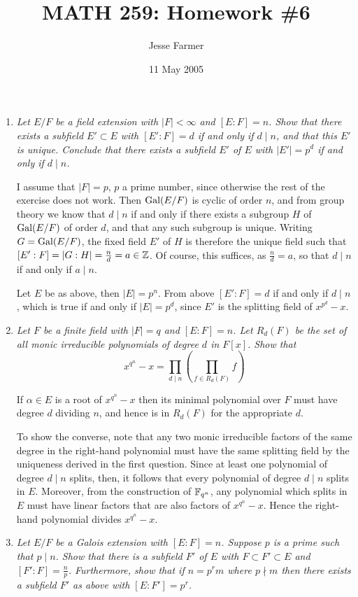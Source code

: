 \documentclass[10pt]{article}
\title{MATH 259: Homework \#6}
\author{Jesse Farmer}
\date{11 May 2005}
\begin{document}
\maketitle
\begin{enumerate}

\item \emph{Let $E/F$ be a field extension with $|F| < \infty$ and $[E:F] = n$.  Show that there exists a subfield $E' \subset E$ with $[E':F] = d$ if and only if $d \mid n$, and that this $E'$ is unique.  Conclude that there exists a subfield $E'$ of $E$ with $|E'| = p^d$ if and only if $d \mid n$.}

I assume that $|F| = p$, $p$ a prime number, since otherwise the rest of the exercise does not work.  Then $\operatorname{Gal}(E/F)$ is cyclic of order $n$, and from group theory we know that $d \mid n$ if and only if there exists a subgroup $H$ of $\operatorname{Gal}(E/F)$ of order $d$, and that any such subgroup is unique.  Writing $G = \operatorname{Gal}(E/F)$, the fixed field $E'$ of $H$ is therefore the unique field such that $[E':F] = |G:H| = \frac{n}{d} = a \in \mathbb{Z}$.  Of course, this suffices, as $\frac{n}{d} = a$, so that $d \mid n$ if and only if $a \mid n$.

Let $E$ be as above, then $|E| = p^n$.  From above $[E':F] = d$ if and only if $d \mid n$, which is true if and only if $|E| = p^d$, since $E'$ is the splitting field of $x^{p^d} - x$.

\item \emph{Let $F$ be a finite field with $|F| = q$ and $[E:F] = n$.  Let $R_d(F)$ be the set of all monic irreducible polynomials of degree $d$ in $F[x]$.  Show that $$x^{q^n} - x = \prod_{d \mid n}\left(\prod_{f \in R_d(F)} f\right)$$}

If $\alpha \in E$ is a root of $x^{q^n} - x$ then its minimal polynomial over $F$ must have degree $d$ dividing $n$, and hence is in $R_d(F)$ for the appropriate $d$.

To show the converse, note that any two monic irreducible factors of the same degree in the right-hand polynomial must have the same splitting field by the uniqueness derived in the first question.  Since at least one polynomial of degree $d \mid n$ splits, then, it follows that every polynomial of degree $d \mid n$ splits in $E$.  Moreover, from the construction of $\mathbb{F}_{q^n}$, any polynomial which splits in $E$ must have linear factors that are also factors of $x^{q^n} - x$.  Hence the right-hand polynomial divides $x^{q^n} - x$.

\item \emph{Let $E/F$ be a Galois extension with $[E:F] = n$.  Suppose $p$ is a prime such that $p \mid n$.  Show that there is a subfield $F'$ of $E$ with $F \subset F' \subset E$ and $[F':F] = \frac{n}{p}$.  Furthermore, show that if $n = p^rm$ where $p \nmid m$ then there exists a subfield $F'$ as above with $[E:F'] = p^r$.}


\end{enumerate}
\end{document}
